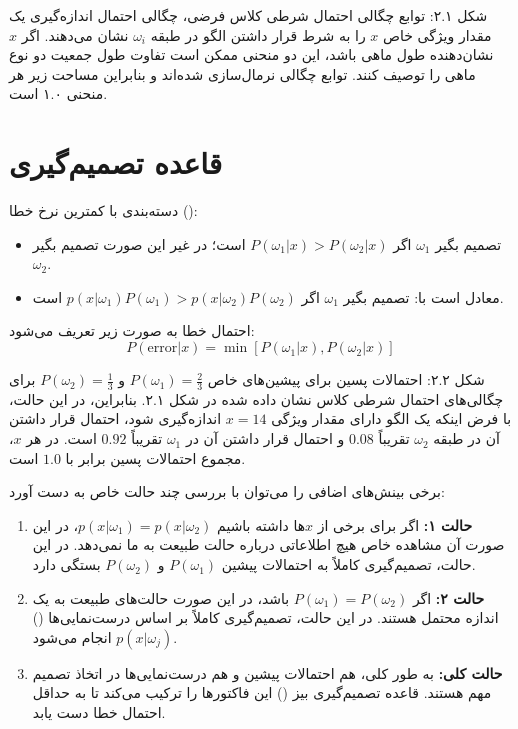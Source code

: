 \documentclass{article}
\begin{document}
شکل ۲.۱: توابع چگالی احتمال شرطی کلاس فرضی، چگالی احتمال اندازه‌گیری یک مقدار ویژگی خاص $x$ را به شرط قرار داشتن الگو در طبقه $\omega_i$ نشان می‌دهند. اگر $x$ نشان‌دهنده طول ماهی باشد، این دو منحنی ممکن است تفاوت طول جمعیت دو نوع ماهی را توصیف کنند. توابع چگالی نرمال‌سازی شده‌اند و بنابراین مساحت زیر هر منحنی ۱.۰ است.

\section*{قاعده تصمیم‌گیری}
دسته‌بندی با کمترین نرخ خطا ():
\begin{itemize}
    \item تصمیم بگیر $\omega_1$ اگر $P(\omega_1|x) > P(\omega_2|x)$ است؛ در غیر این صورت تصمیم بگیر $\omega_2$.
    \item معادل است با: تصمیم بگیر $\omega_1$ اگر $p(x|\omega_1)P(\omega_1) > p(x|\omega_2)P(\omega_2)$ است.
\end{itemize}
احتمال خطا به صورت زیر تعریف می‌شود:
\[
P(\text{error}|x) = \min[P(\omega_1|x), P(\omega_2|x)]
\]

شکل ۲.۲: احتمالات پسین برای پیشین‌های خاص $P(\omega_1) = \frac{2}{3}$ و $P(\omega_2) = \frac{1}{3}$ برای چگالی‌های احتمال شرطی کلاس نشان داده شده در شکل ۲.۱. بنابراین، در این حالت، با فرض اینکه یک الگو دارای مقدار ویژگی $x=14$ اندازه‌گیری شود، احتمال قرار داشتن آن در طبقه $\omega_2$ تقریباً $0.08$ و احتمال قرار داشتن آن در $\omega_1$ تقریباً $0.92$ است. در هر $x$، مجموع احتمالات پسین برابر با $1.0$ است.

برخی بینش‌های اضافی را می‌توان با بررسی چند حالت خاص به دست آورد:
\begin{enumerate}
    \item \textbf{حالت ۱:} اگر برای برخی از $x$ها داشته باشیم $p(x|\omega_1) = p(x|\omega_2)$، در این صورت آن مشاهده خاص هیچ اطلاعاتی درباره حالت طبیعت به ما نمی‌دهد. در این حالت، تصمیم‌گیری کاملاً به احتمالات پیشین $P(\omega_1)$ و $P(\omega_2)$ بستگی دارد.
    \item \textbf{حالت ۲:} اگر $P(\omega_1) = P(\omega_2)$ باشد، در این صورت حالت‌های طبیعت به یک اندازه محتمل هستند. در این حالت، تصمیم‌گیری کاملاً بر اساس درست‌نمایی‌ها () $p(x|\omega_j)$ انجام می‌شود.
    \item \textbf{حالت کلی:} به طور کلی، هم احتمالات پیشین و هم درست‌نمایی‌ها در اتخاذ تصمیم مهم هستند. قاعده تصمیم‌گیری بیز () این فاکتورها را ترکیب می‌کند تا به حداقل احتمال خطا دست یابد.
\end{enumerate}
\end{document}
